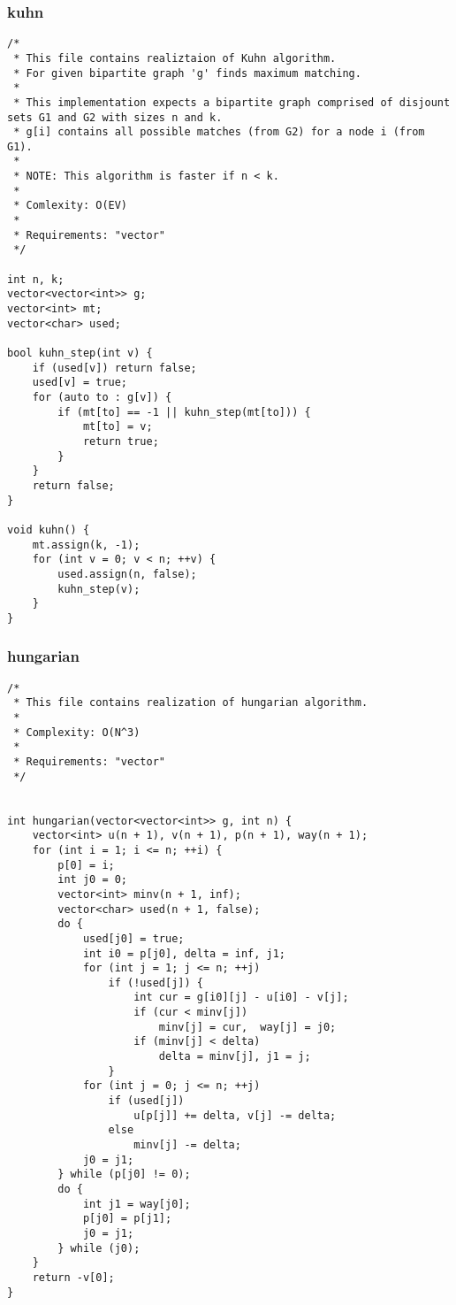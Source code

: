\subsubsection{kuhn}
\begin{lstlisting}
/*
 * This file contains realiztaion of Kuhn algorithm.
 * For given bipartite graph 'g' finds maximum matching.
 * 
 * This implementation expects a bipartite graph comprised of disjount sets G1 and G2 with sizes n and k.
 * g[i] contains all possible matches (from G2) for a node i (from G1).
 * 
 * NOTE: This algorithm is faster if n < k.
 *
 * Comlexity: O(EV)
 *
 * Requirements: "vector"
 */

int n, k;
vector<vector<int>> g;
vector<int> mt;
vector<char> used;

bool kuhn_step(int v) {
    if (used[v]) return false;
    used[v] = true;
    for (auto to : g[v]) {
        if (mt[to] == -1 || kuhn_step(mt[to])) {
            mt[to] = v;
            return true;
        }
    }
    return false;
}

void kuhn() {
    mt.assign(k, -1);
    for (int v = 0; v < n; ++v) {
        used.assign(n, false);
        kuhn_step(v);
    }
}

\end{lstlisting}
\subsubsection{hungarian}
\begin{lstlisting}
/*
 * This file contains realization of hungarian algorithm.
 * 
 * Complexity: O(N^3)
 *
 * Requirements: "vector"
 */


int hungarian(vector<vector<int>> g, int n) {
    vector<int> u(n + 1), v(n + 1), p(n + 1), way(n + 1);
    for (int i = 1; i <= n; ++i) {
        p[0] = i;
        int j0 = 0;
        vector<int> minv(n + 1, inf);
        vector<char> used(n + 1, false);
        do {
            used[j0] = true;
            int i0 = p[j0], delta = inf, j1;
            for (int j = 1; j <= n; ++j)
                if (!used[j]) {
                    int cur = g[i0][j] - u[i0] - v[j];
                    if (cur < minv[j])
                        minv[j] = cur,  way[j] = j0;
                    if (minv[j] < delta)
                        delta = minv[j], j1 = j;
                }
            for (int j = 0; j <= n; ++j)
                if (used[j])
                    u[p[j]] += delta, v[j] -= delta;
                else
                    minv[j] -= delta;
            j0 = j1;
        } while (p[j0] != 0);
        do {
            int j1 = way[j0];
            p[j0] = p[j1];
            j0 = j1;
        } while (j0);
    }
    return -v[0];
}

\end{lstlisting}
